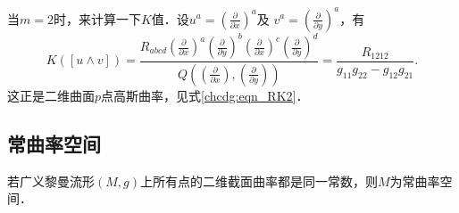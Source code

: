 \begin{example}\label{chrg:exam_sc-gauss}
    当$m=2$时，来计算一下$K$值．设$u^a=(\frac{\partial}{\partial x})^a$及
    $v^a=(\frac{\partial}{\partial y})^a$，有
    \begin{equation}
        K([u\wedge v]) = \frac{R_{abcd} (\frac{\partial}{\partial x})^a (\frac{\partial}{\partial y})^b
            (\frac{\partial}{\partial x})^c (\frac{\partial}{\partial y})^d}
          {Q((\frac{\partial}{\partial x}),(\frac{\partial}{\partial y}))}
        =\frac{R_{1212}}{g_{11}g_{22}-g_{12}g_{21}} .
    \end{equation}
    这正是二维曲面$p$点高斯曲率，见式\eqref{chcdg:eqn_RK2}．
\end{example}


\subsection{常曲率空间}\label{chrg:sec_const-curvature}
\begin{definition}
        若广义黎曼流形$(M,g)$上所有点的二维截面曲率都是同一常数，则$M$为{\heiti 常曲率空间}．
\end{definition}

